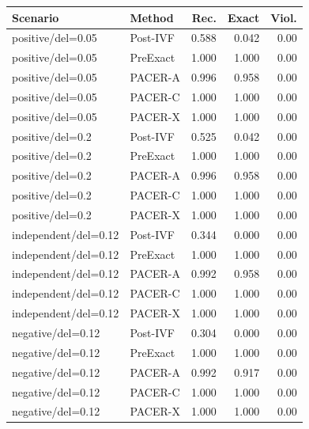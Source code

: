 \begin{tabular}{llrrr}
\toprule
Scenario & Method & Rec. & Exact & Viol.\\
\midrule
positive/del=0.05 & Post-IVF & 0.588 & 0.042 & 0.00\\
positive/del=0.05 & PreExact & 1.000 & 1.000 & 0.00\\
positive/del=0.05 & PACER-A & 0.996 & 0.958 & 0.00\\
positive/del=0.05 & PACER-C & 1.000 & 1.000 & 0.00\\
positive/del=0.05 & PACER-X & 1.000 & 1.000 & 0.00\\
positive/del=0.2 & Post-IVF & 0.525 & 0.042 & 0.00\\
positive/del=0.2 & PreExact & 1.000 & 1.000 & 0.00\\
positive/del=0.2 & PACER-A & 0.996 & 0.958 & 0.00\\
positive/del=0.2 & PACER-C & 1.000 & 1.000 & 0.00\\
positive/del=0.2 & PACER-X & 1.000 & 1.000 & 0.00\\
independent/del=0.12 & Post-IVF & 0.344 & 0.000 & 0.00\\
independent/del=0.12 & PreExact & 1.000 & 1.000 & 0.00\\
independent/del=0.12 & PACER-A & 0.992 & 0.958 & 0.00\\
independent/del=0.12 & PACER-C & 1.000 & 1.000 & 0.00\\
independent/del=0.12 & PACER-X & 1.000 & 1.000 & 0.00\\
negative/del=0.12 & Post-IVF & 0.304 & 0.000 & 0.00\\
negative/del=0.12 & PreExact & 1.000 & 1.000 & 0.00\\
negative/del=0.12 & PACER-A & 0.992 & 0.917 & 0.00\\
negative/del=0.12 & PACER-C & 1.000 & 1.000 & 0.00\\
negative/del=0.12 & PACER-X & 1.000 & 1.000 & 0.00\\
\bottomrule
\end{tabular}
